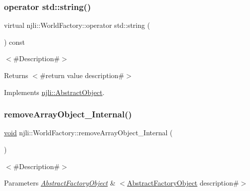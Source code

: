 \subsubsection{\texorpdfstring{operator std\+::string()}{operator std::string()}}
{\footnotesize\ttfamily virtual njli\+::\+World\+Factory\+::operator std\+::string (\begin{DoxyParamCaption}{ }\end{DoxyParamCaption}) const\hspace{0.3cm}{\ttfamily [virtual]}}

$<$\#\+Description\#$>$

\begin{DoxyReturn}{Returns}
$<$\#return value description\#$>$ 
\end{DoxyReturn}


Implements \mbox{\hyperlink{classnjli_1_1_abstract_object_afc07f4138bd3003910e7aa7fa0fe11ad}{njli\+::\+Abstract\+Object}}.

\mbox{\label{classnjli_1_1_world_factory_afceced94230870133427e27148963c58}} 
\subsubsection{\texorpdfstring{remove\+Array\+Object\+\_\+\+Internal()}{removeArrayObject\_Internal()}}
{\footnotesize\ttfamily \mbox{\hyperlink{_thread_8h_af1e856da2e658414cb2456cb6f7ebc66}{void}} njli\+::\+World\+Factory\+::remove\+Array\+Object\+\_\+\+Internal (\begin{DoxyParamCaption}\item[{\mbox{\hyperlink{classnjli_1_1_abstract_factory_object}{Abstract\+Factory\+Object}} $\ast$$\ast$}]{ }\end{DoxyParamCaption})\hspace{0.3cm}{\ttfamily [protected]}}

$<$\#\+Description\#$>$


\begin{DoxyParams}{Parameters}
{\em \mbox{\hyperlink{classnjli_1_1_abstract_factory_object}{Abstract\+Factory\+Object}}} & $<$\mbox{\hyperlink{classnjli_1_1_world_factory_a59f5fcb165066624f68fb5417aa3586e}{Abstract\+Factory\+Object}} description\#$>$ \\
\hline
\end{DoxyParams}
\mbox{\label{classnjli_1_1_world_factory_a2e3f3c897e12187b0413ed58b85fba9b}} 
